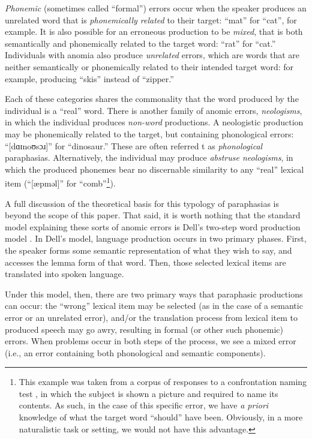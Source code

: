 \documentclass[11pt,letterpaper]{article}
\begin{document}
\emph{Phonemic} (sometimes called ``formal'') errors occur when the speaker produces an unrelated word that is \emph{phonemically related} to their target: ``mat'' for ``cat'', for example.
It is also possible for an erroneous production to be \emph{mixed}, that is both semantically and phonemically related to the target word: ``rat'' for ``cat.''
Individuals with anomia also produce \emph{unrelated} errors, which are words that are neither semantically or phonemically related to their intended target word: for example, producing ``skis'' instead of ``zipper.''

Each of these categories shares the commonality that the word produced by the individual is a ``real'' word. There is another family of anomic errors, \emph{neologisms}, in which the individual produces \emph{non-word} productions.
A neologistic production may be phonemically related to the target, but containing phonological errors: ``[dɑɪnoʊsɔɹ]'' for ``dinosaur.''
These are often referred t as \emph{phonological} paraphasias.
Alternatively, the individual may produce \emph{abstruse neologisms}, in which the produced phonemes bear no discernable similarity to any ``real'' lexical item (``[æpməl]'' for ``comb''\footnote{This example was taken from a corpus of responses to a confrontation naming test \cite{Mirman:2010cd}, in which the subject is shown a picture and required to name its contents. As such, in the case of this specific error, we have \emph{a priori} knowledge of what the target word ``should'' have been. Obviously, in a more naturalistic task or setting, we would not have this advantage.}).

A full discussion of the theoretical basis for this typology of paraphasias is beyond the scope of this paper.
That said, it is worth nothing that the standard model explaining these sorts of anomic errors is Dell's two-step word production model \cite{Dell:1997wj,Dell:1986vk}.
In Dell's model, language production occurs in two primary phases.
First, the speaker forms some semantic representation of what they wish to say, and accesses the lemma form of that word.
Then, those selected lexical items are translated into spoken language.

Under this model, then, there are two primary ways that paraphasic productions can occur: the ``wrong'' lexical item may be selected (as in the case of a semantic error or an unrelated error), and/or the translation process from lexical item to produced speech may go awry, resulting in formal (or other such phonemic) errors.
When problems occur in both steps of the process, we see a mixed error (i.e., an error containing both phonological and semantic components).
\end{document}
